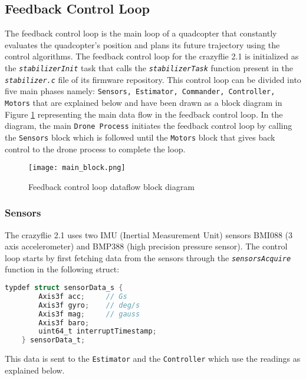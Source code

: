 \documentclass[10pt, a4paper]{article}
\newcommand{\textFunc}[1]{\texttt{\textit{#1}}}
\newcommand{\textDef}[1]{\texttt{#1}}
\newcommand{\fig}[1]{Figure \ref{#1}}
\begin{document}
    \subsection{Feedback Control Loop}
    The feedback control loop is the main loop of a quadcopter that constantly evaluates the quadcopter's position and plans its future trajectory using the control algorithms. The feedback control loop for the crazyflie 2.1 is initialized as the \textFunc{stabilizerInit} task that calls the \textFunc{stabilizerTask} function present in the \textFunc{stabilizer.c} file of its firmware repository. This control loop can be divided into five main phases namely: \textDef{Sensors, Estimator, Commander, Controller, Motors} that are explained below and have been drawn as a block diagram in \fig{block} representing the main data flow in the feedback control loop. In the diagram, the main \textDef{Drone Process} initiates the feedback control loop by calling the \textDef{Sensors} block which is followed until the \textDef{Motors} block that gives back control to the drone process to complete the loop.

\begin{figure}[hbt!]
    \centering
    \texttt{[image: main\_block.png]}
    \caption{Feedback control loop dataflow block diagram}
    \label{block}
\end{figure}

    \subsubsection{Sensors}
    \label{sensors}
        The crazyflie 2.1 uses two IMU (Inertial Measurement Unit) sensors BMI088 (3 axis accelerometer) and BMP388 (high precision pressure sensor). The control loop starts by first fetching data from the sensors through the \textFunc{sensorsAcquire} function in the following struct:
        \begin{lstlisting}[language=C]
    typdef struct sensorData_s {
        Axis3f acc;     // Gs
        Axis3f gyro;    // deg/s
        Axis3f mag;     // gauss
        Axis3f baro;
        uint64_t interruptTimestamp;
    } sensorData_t;
        \end{lstlisting}
        This data is sent to the \textDef{Estimator} and the \textDef{Controller} which use the readings as explained below.
\end{document}
